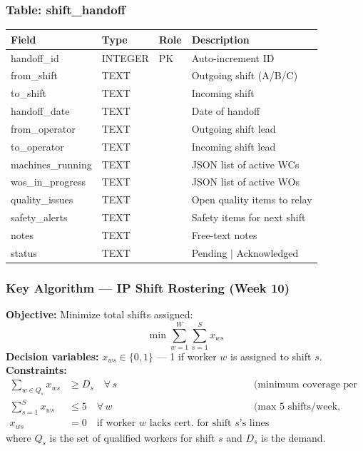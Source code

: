 \documentclass[11pt]{article}
\begin{document}
\subsubsection*{Table: shift\_handoff}
\begin{table}[H]\centering\small
\begin{tabular}{@{} l l l L{5.0cm} @{}}
\toprule
\textbf{Field} & \textbf{Type} & \textbf{Role} & \textbf{Description} \\
\midrule
handoff\_id     & INTEGER & PK  & Auto-increment ID \\
from\_shift     & TEXT    &     & Outgoing shift (A/B/C) \\
to\_shift       & TEXT    &     & Incoming shift \\
handoff\_date   & TEXT    &     & Date of handoff \\
from\_operator  & TEXT    &     & Outgoing shift lead \\
to\_operator    & TEXT    &     & Incoming shift lead \\
machines\_running & TEXT  &     & JSON list of active WCs \\
wos\_in\_progress & TEXT  &     & JSON list of active WOs \\
quality\_issues & TEXT    &     & Open quality items to relay \\
safety\_alerts  & TEXT    &     & Safety items for next shift \\
notes           & TEXT    &     & Free-text notes \\
status          & TEXT    &     & Pending $\mid$ Acknowledged \\
\bottomrule
\end{tabular}
\end{table}

\subsubsection*{Key Algorithm --- IP Shift Rostering (Week 10)}

\begin{eqbox}
\textbf{Objective:} Minimize total shifts assigned:
\[
\min \sum_{w=1}^{W}\sum_{s=1}^{S} x_{ws}
\]
\textbf{Decision variables:} $x_{ws} \in \{0,1\}$ --- 1 if worker $w$ is assigned to shift $s$.\\[4pt]
\textbf{Constraints:}
\begin{align}
\sum_{w \in Q_s} x_{ws} &\geq D_s \quad \forall\, s & \text{(minimum coverage per shift)} \\
\sum_{s=1}^{S} x_{ws} &\leq 5 \quad \forall\, w & \text{(max 5 shifts/week, OSHA)} \\
x_{ws} &= 0 \quad \text{if worker } w \text{ lacks cert.\ for shift } s\text{'s lines}
\end{align}
where $Q_s$ is the set of qualified workers for shift $s$ and $D_s$ is the demand.
\end{eqbox}
\end{document}
